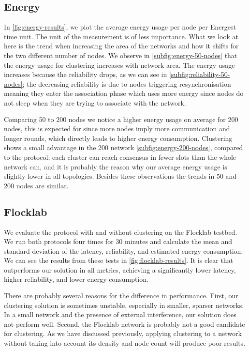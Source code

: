 \subsection{Energy}
In \cref{fig:energy-results}, we plot the average energy usage per node per Energest time unit. The unit of the measurement is of less importance. What we look at here is the trend when increasing the area of the networks and how it shifts for the two different number of nodes. We observe in \cref{subfig:energy-50-nodes} that the energy usage for clustering increases with network area. The energy usage increases because the reliability drops, as we can see in \cref{subfig:reliability-50-nodes}; the decreasing reliability is due to nodes triggering resynchronisation meaning they enter the association phase which uses more energy since nodes do not sleep when they are trying to associate with the network.

Comparing 50 to 200 nodes we notice a higher energy usage on average for 200 nodes, this is expected for \atwo{} since more nodes imply more communication and longer rounds, which directly leads to higher energy consumption. Clustering shows a small advantage in the 200 network \cref{subfig:energy-200-nodes}, compared to the \atwo{} protocol; each cluster can reach consensus in fewer slots than the whole network can, and it is probably the reason why our average energy usage is slightly lower in all topologies. Besides these observations the trends in 50 and 200 nodes are similar.



\subsection{Flocklab}
We evaluate the \atwo{} protocol with and without clustering on the Flocklab testbed. We run both protocols four times for 30 minutes and calculate the mean and standard deviation of the latency, reliability, and estimated energy consumption; We can see the results from these tests in \cref{fig:flocklab-results}. It is clear that \atwo{} outperforms our solution in all metrics, achieving a significantly lower latency, higher reliability, and lower energy consumption.

There are probably several reasons for the difference in performance. First, our clustering solution is sometimes unstable, especially in smaller, sparser networks. In a small network and the presence of external interference, our solution does not perform well. Second, the Flocklab network is probably not a good candidate for clustering. As we have discussed previously, applying clustering to a network without taking into account its density and node count will produce poor results.

